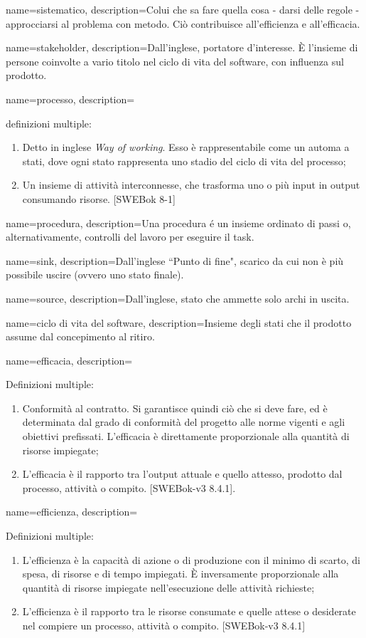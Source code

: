 {
name=sistematico,
description={Colui che sa fare quella cosa - darsi delle regole - approcciarsi al problema con metodo. Ci\`o contribuisce all'efficienza e all'efficacia.}
}

{
name=stakeholder,
description={Dall'inglese, portatore d'interesse. È l'insieme di persone coinvolte a vario titolo nel ciclo di vita del software, con influenza sul prodotto.}
}

{
name=processo, 
description={definizioni multiple:
\begin{enumerate}
\item Detto in inglese \textit{Way of working}. Esso \`e rappresentabile come un automa a stati, dove ogni stato rappresenta uno stadio del ciclo di vita del processo;
\item Un insieme di attività interconnesse, che trasforma uno o più input in output consumando risorse. [SWEBok 8-1]
\end{enumerate}
}
}

{
name=procedura,
description={Una procedura \'e un insieme ordinato di passi o, alternativamente, controlli del lavoro per eseguire il task.}
}


{
name=sink,
description={Dall'inglese ``Punto di fine", scarico da cui non è più possibile uscire (ovvero uno stato finale).}
}

{
name=source,
description={Dall'inglese, stato che ammette solo archi in uscita.}
}

{
name=ciclo di vita del software,
description={Insieme degli stati che il prodotto assume dal concepimento al ritiro.}
}

{
name=efficacia,
description={Definizioni multiple:
\begin{enumerate}
\item Conformit\`a al contratto. Si garantisce quindi ci\`o che si deve fare, ed \`e determinata dal grado di conformit\`a del progetto alle norme vigenti e agli obiettivi prefissati. L'efficacia \`e direttamente proporzionale alla quantit\`a di risorse impiegate;
\item L'efficacia \`e il rapporto tra l'output attuale e quello attesso, prodotto dal processo, attivit\`a o compito. [SWEBok-v3 8.4.1].
\end{enumerate}
}
}

{
name=efficienza,
description={Definizioni multiple: 
\begin{enumerate}
\item L'efficienza \`e la capacit\`a di azione o di produzione con il minimo di scarto, di spesa, di risorse e di tempo impiegati. \`E inversamente proporzionale alla quantit\`a di risorse impiegate nell'esecuzione delle attivit\`a richieste;
\item L'efficienza \`e il rapporto tra le risorse consumate e quelle attese o desiderate nel compiere un processo, attivit\`a o compito. [SWEBok-v3 8.4.1]
\end{enumerate}
}
}

